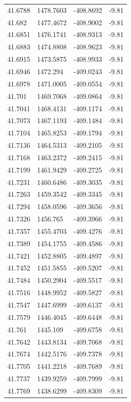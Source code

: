 \begin{table}[H]
\begin{tabular}{llll}
41.6788 & 1478.7603 & -408.8692 & -9.81 \\
41.682 & 1477.4672 & -408.9002 & -9.81 \\
41.6851 & 1476.1741 & -408.9313 & -9.81 \\
41.6883 & 1474.8808 & -408.9623 & -9.81 \\
41.6915 & 1473.5875 & -408.9933 & -9.81 \\
41.6946 & 1472.294 & -409.0243 & -9.81 \\
41.6978 & 1471.0005 & -409.0554 & -9.81 \\
41.701 & 1469.7068 & -409.0864 & -9.81 \\
41.7041 & 1468.4131 & -409.1174 & -9.81 \\
41.7073 & 1467.1193 & -409.1484 & -9.81 \\
41.7104 & 1465.8253 & -409.1794 & -9.81 \\
41.7136 & 1464.5313 & -409.2105 & -9.81 \\
41.7168 & 1463.2372 & -409.2415 & -9.81 \\
41.7199 & 1461.9429 & -409.2725 & -9.81 \\
41.7231 & 1460.6486 & -409.3035 & -9.81 \\
41.7263 & 1459.3542 & -409.3345 & -9.81 \\
41.7294 & 1458.0596 & -409.3656 & -9.81 \\
41.7326 & 1456.765 & -409.3966 & -9.81 \\
41.7357 & 1455.4703 & -409.4276 & -9.81 \\
41.7389 & 1454.1755 & -409.4586 & -9.81 \\
41.7421 & 1452.8805 & -409.4897 & -9.81 \\
41.7452 & 1451.5855 & -409.5207 & -9.81 \\
41.7484 & 1450.2904 & -409.5517 & -9.81 \\
41.7516 & 1448.9952 & -409.5827 & -9.81 \\
41.7547 & 1447.6999 & -409.6137 & -9.81 \\
41.7579 & 1446.4045 & -409.6448 & -9.81 \\
41.761 & 1445.109 & -409.6758 & -9.81 \\
41.7642 & 1443.8134 & -409.7068 & -9.81 \\
41.7674 & 1442.5176 & -409.7378 & -9.81 \\
41.7705 & 1441.2218 & -409.7689 & -9.81 \\
41.7737 & 1439.9259 & -409.7999 & -9.81 \\
41.7769 & 1438.6299 & -409.8309 & -9.81 \\

\end{tabular}
\end{table}
